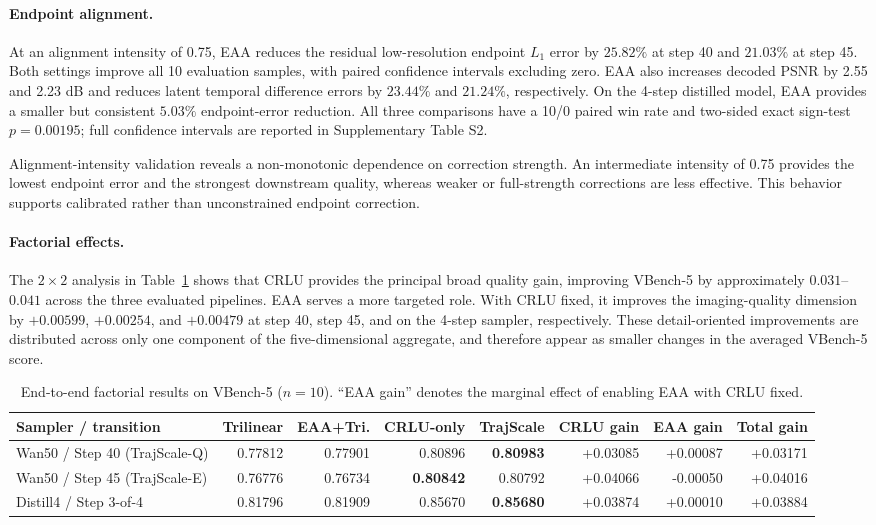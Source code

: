 \paragraph{Endpoint alignment.}
At an alignment intensity of 0.75, EAA reduces the residual
low-resolution endpoint \(L_1\) error by \(25.82\%\) at step 40 and
\(21.03\%\) at step 45. Both settings improve all 10 evaluation
samples, with paired confidence intervals excluding zero. EAA also
increases decoded PSNR by 2.55 and 2.23 dB and reduces latent temporal
difference errors by \(23.44\%\) and \(21.24\%\), respectively. On the
4-step distilled model, EAA provides a smaller but consistent
\(5.03\%\) endpoint-error reduction. All three comparisons have a
10/0 paired win rate and two-sided exact sign-test \(p=0.00195\); full
confidence intervals are reported in Supplementary Table S2.

Alignment-intensity validation reveals a non-monotonic dependence on
correction strength. An intermediate intensity of 0.75 provides the
lowest endpoint error and the strongest downstream quality, whereas
weaker or full-strength corrections are less effective. This behavior
supports calibrated rather than unconstrained endpoint correction.

\paragraph{Factorial effects.}
The \(2\times2\) analysis in Table~\ref{tab:factorial} shows that CRLU
provides the principal broad quality gain, improving VBench-5 by
approximately \(0.031\)--\(0.041\) across the three evaluated
pipelines. EAA serves a more targeted role. With CRLU fixed, it improves
the imaging-quality dimension by \(+0.00599\), \(+0.00254\), and
\(+0.00479\) at step 40, step 45, and on the 4-step sampler,
respectively. These detail-oriented improvements are distributed across
only one component of the five-dimensional aggregate, and therefore
appear as smaller changes in the averaged VBench-5 score.

\begin{table}[!t]
\centering
\footnotesize
\setlength{\tabcolsep}{4.5pt}
\begin{tabular}{lrrrrrrr}
\toprule
Sampler / transition & Trilinear & EAA+Tri. & CRLU-only & TrajScale &
CRLU gain & EAA gain & Total gain \\
\midrule
Wan50 / Step 40 (TrajScale-Q) & 0.77812 & 0.77901 & 0.80896 &
\textbf{0.80983} & +0.03085 & +0.00087 & +0.03171 \\
Wan50 / Step 45 (TrajScale-E) & 0.76776 & 0.76734 &
\textbf{0.80842} & 0.80792 & +0.04066 & -0.00050 & +0.04016 \\
Distill4 / Step 3-of-4 & 0.81796 & 0.81909 & 0.85670 &
\textbf{0.85680} & +0.03874 & +0.00010 & +0.03884 \\
\bottomrule
\end{tabular}
\caption{End-to-end factorial results on VBench-5 (\(n=10\)).
``EAA gain'' denotes the marginal effect of enabling EAA with CRLU
fixed.}
\label{tab:factorial}
\end{table}

